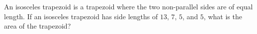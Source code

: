 An isosceles trapezoid is a trapezoid where the two non-parallel sides are of equal length. If an isosceles trapezoid has side lengths of $13$, $7$, $5$, and $5$, what is the area of the trapezoid?
